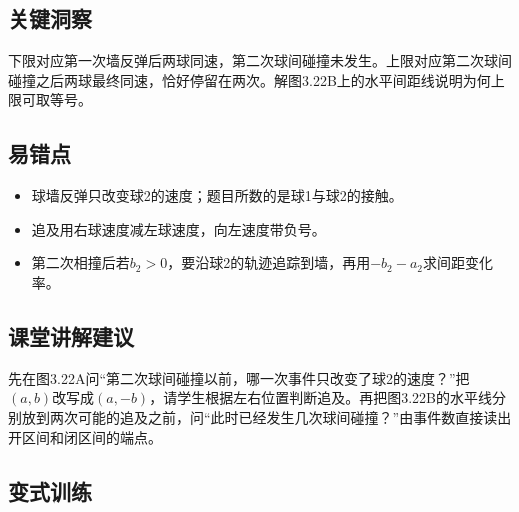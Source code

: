 \documentclass[UTF8,fontset=fandol,a4paper,11pt]{ctexart}
\begin{document}


\subsection*{关键洞察}

下限对应第一次墙反弹后两球同速，第二次球间碰撞未发生。上限对应第二次球间碰撞之后两球最终同速，恰好停留在两次。解图3.22B上的水平间距线说明为何上限可取等号。



\subsection*{易错点}

\begin{itemize}
\item 球墙反弹只改变球2的速度；题目所数的是球1与球2的接触。
\item 追及用右球速度减左球速度，向左速度带负号。
\item 第二次相撞后若$b_2>0$，要沿球2的轨迹追踪到墙，再用$-b_2-a_2$求间距变化率。
\end{itemize}



\subsection*{课堂讲解建议}

先在图3.22A问“第二次球间碰撞以前，哪一次事件只改变了球2的速度？”把$(a,b)$改写成$(a,-b)$，请学生根据左右位置判断追及。再把图3.22B的水平线分别放到两次可能的追及之前，问“此时已经发生几次球间碰撞？”由事件数直接读出开区间和闭区间的端点。



\subsection*{变式训练}
\end{document}
